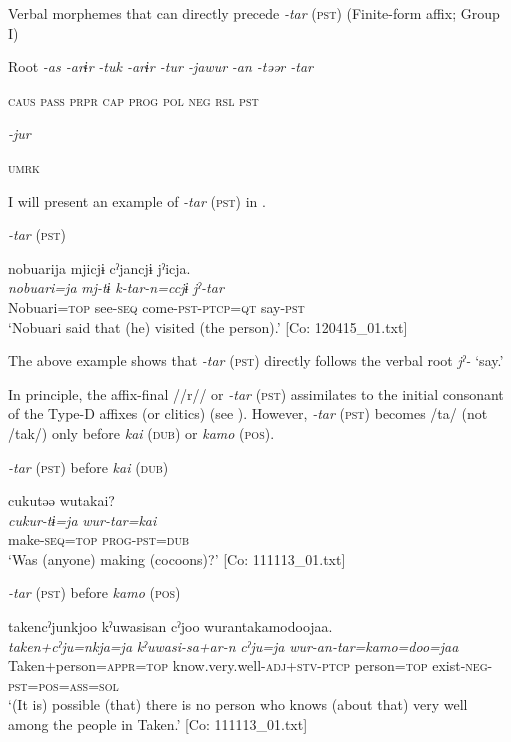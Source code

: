\ea\label{ex:8-55}
  Verbal morphemes that can directly precede \textit{-tar} (\textsc{pst}) (Finite-form affix; Group I)

  Root  \textit{-as  -arɨr} %
\textit{-tuk  -arɨr  -tur  -jawur} %
\textit{-an  -təər  -tar}

    \textsc{caus}  \textsc{pass}  \textsc{prpr}  \textsc{cap}  \textsc{prog}  \textsc{pol}  \textsc{neg}  \textsc{rsl}  \textsc{pst}

          \textit{-jur}

          \textsc{umrk}
\z

I will present an example of \textit{-tar} (\textsc{pst}) in .

\ea\label{ex:8-56}
  \textit{-tar} (\textsc{pst})

  {\TM}
\glll  nobuarija  mjicjɨ  cˀjancjɨ  jˀicja.\\
\textit{nobuari=ja}  \textit{mj-tɨ}  \textit{k-tar-n=ccjɨ}  \textit{jˀ-tar}\\
    Nobuari=\textsc{top}  see-\textsc{seq}  come-\textsc{pst}-\textsc{ptcp}=\textsc{qt}  say-\textsc{pst}\\
\glt ‘Nobuari said that (he) visited (the person).’ [Co: 120415\_01.txt]
\z

The above example shows that \textit{-tar} (\textsc{pst}) directly follows the verbal root \textit{jˀ-} ‘say.’

In principle, the affix-final //r// or \textit{-tar} (\textsc{pst}) assimilates to the initial consonant of the Type-D affixes (or clitics) (see ). However, \textit{-tar} (\textsc{pst}) becomes /ta/ (not /tak/) only before \textit{kai} (\textsc{dub}) or \textit{kamo} (\textsc{pos}).

\ea\label{ex:8-57}
\ea \textit{-tar} (\textsc{pst}) before \textit{kai} (\textsc{dub})

  {\TM}
\glll  cukutəə  wutakai?\\
\textit{cukur-tɨ=ja}  \textit{wur-tar=kai}\\
    make-\textsc{seq}=\textsc{top}  \textsc{prog}-\textsc{pst}=\textsc{dub}\\
\glt ‘Was (anyone) making (cocoons)?’ [Co: 111113\_01.txt]


\ex \textit{-tar} (\textsc{pst}) before \textit{kamo} (\textsc{pos})

  {\TM}
\glll  takencˀjunkjoo  kˀuwasisan  cˀjoo    wurantakamodoojaa.\\
\textit{taken+cˀju=nkja=ja}  \textit{kˀuwasi-sa+ar-n}  \textit{cˀju=ja}    \textit{wur-an-tar=kamo=doo=jaa}\\
    Taken+person=\textsc{appr}=\textsc{top}  know.very.well-\textsc{adj}+\textsc{stv}-\textsc{ptcp}  person=\textsc{top}  exist-\textsc{neg}-\textsc{pst}=\textsc{pos}=\textsc{ass}=\textsc{sol}\\
\glt ‘(It is) possible (that) there is no person who knows (about that) very well among the people in Taken.’ [Co: 111113\_01.txt]
\z
\z

